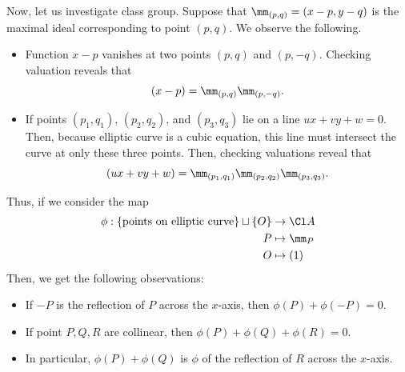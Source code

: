 Now, let us investigate class group.
Suppose that $\mm_{(p,q)} = (x-p, y-q)$
is the maximal ideal corresponding to point $(p,q)$.
We observe the following.
\begin{itemize}
    \item Function $x-p$ vanishes at two points 
    $(p,q)$ and $(p,-q)$. Checking valuation reveals that
    $$(x-p) = \mm_{(p,q)} \mm_{(p,-q)}.$$
    \item If points $(p_1, q_1)$, $(p_2,q_2)$,
    and $(p_3,q_3)$ lie on a line $ux+vy+w=0$.
    Then, because elliptic curve is a cubic equation,
    this line must intersect the curve at
    only these three points.
    Then, checking  valuations reveal that
    $$(ux+vy+w) = \mm_{(p_1,q_1)} \mm_{(p_2,q_2)}
    \mm_{(p_3,q_3)}.$$
\end{itemize}
Thus, if we consider the map 
\begin{align*}
    \phi : \{\text{points on elliptic curve}\}
    \sqcup \{O\} &\to \Cl A \\
    P &\mapsto \mm_P \\
    O &\mapsto (1)
\end{align*}
Then, we get the following observations:
\begin{itemize}
    \item If $-P$ is the reflection of $P$ across the 
    $x$-axis, then $\phi(P)+\phi(-P) = 0$.
    \item If point $P,Q,R$ are collinear, then 
    $\phi(P)+\phi(Q)+\phi(R) = 0$.
    \item In particular, $\phi(P)+\phi(Q)$
    is $\phi$ of the reflection of $R$ across the $x$-axis.
\end{itemize}
